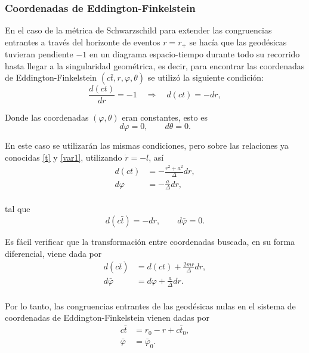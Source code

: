 \subsubsection{Coordenadas de Eddington-Finkelstein} 

En el caso de la métrica de Schwarzschild para extender las congruencias entrantes a través del horizonte de eventos $r=r_+$ se hacía que las geodésicas tuvieran pendiente $-1$ en un diagrama espacio-tiempo durante todo su recorrido hasta llegar a la singularidad geométrica, es decir, para encontrar las coordenadas de Eddington-Finkelstein $(c\bar{t},r,\varphi,\theta)$ se utilizó la siguiente condición: 
\begin{equation}
\frac{d(ct)}{dr}=-1 \quad \Rightarrow \quad d(ct)=-dr,
\end{equation}

Donde las coordenadas $(\varphi,\theta )$ eran constantes, esto es
\begin{equation}
d\varphi=0, \qquad d\theta=0 .
\end{equation}

En este caso se utilizarán las mismas condiciones, pero sobre las relaciones ya conocidas \eqref{t} y \eqref{var1}, utilizando $\dot{r}=-l$, así
\begin{equation}
\begin{aligned}
d(ct)&=-\frac{r^2+a^2}{\Delta}dr,\\
d \varphi&=-\frac{a}{\Delta}dr,\\
\end{aligned}
\end{equation}

tal que
\begin{equation}
d\left(c\bar{t}\right)=-dr, \qquad d\bar{\varphi}=0 .
\end{equation}

Es fácil verificar que la transformación entre coordenadas buscada, en su forma diferencial, viene dada por
\begin{equation}
\begin{aligned}
d\left(c\bar{t}\right)&=d(ct)+\frac{2mr}{\Delta}dr,\\
d\bar{\varphi}&=d	\varphi+\frac{a}{\Delta}dr.\\
\end{aligned}
\end{equation}

Por lo tanto, las congruencias entrantes de las geodésicas nulas  en el sistema de coordenadas de Eddington-Finkelstein vienen dadas por
\begin{equation}
\begin{aligned}
c\bar{t}&=r_0-r+c\bar{t}_0,\\
\bar{\varphi}&=\bar{\varphi}_0.\\
\end{aligned}
\end{equation}

